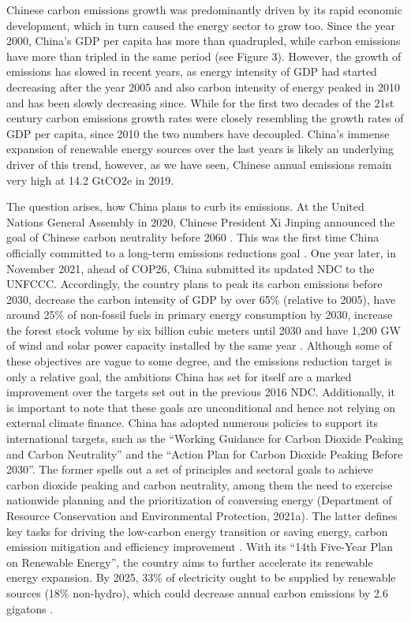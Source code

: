 \documentclass[
  12pt,
]{article}
\numberwithin{equation}{section}
\numberwithin{table}{section}
\numberwithin{figure}{section}
\begin{document}
Chinese carbon emissions growth was predominantly driven by its rapid
economic development, which in turn caused the energy sector to grow
too. Since the year 2000, China's GDP per capita has more than
quadrupled, while carbon emissions have more than tripled in the same
period (see Figure 3). However, the growth of emissions has slowed in
recent years, as energy intensity of GDP had started decreasing after
the year 2005 and also carbon intensity of energy peaked in 2010 and has
been slowly decreasing since. While for the first two decades of the
21st century carbon emissions growth rates were closely resembling the
growth rates of GDP per capita, since 2010 the two numbers have
decoupled. China's immense expansion of renewable energy sources over
the last years is likely an underlying driver of this trend, however, as
we have seen, Chinese annual emissions remain very high at 14.2 GtCO2e
in 2019.

The question arises, how China plans to curb its emissions. At the
United Nations General Assembly in 2020, Chinese President Xi Jinping
announced the goal of Chinese carbon neutrality before 2060
\citep{Jinping2020}. This was the first time China officially committed
to a long-term emissions reductions goal \citep{CAT2022}. One year
later, in November 2021, ahead of COP26, China submitted its updated NDC
to the UNFCCC. Accordingly, the country plans to peak its carbon
emissions before 2030, decrease the carbon intensity of GDP by over 65\%
(relative to 2005), have around 25\% of non-fossil fuels in primary
energy consumption by 2030, increase the forest stock volume by six
billion cubic meters until 2030 and have 1,200 GW of wind and solar
power capacity installed by the same year \citep{China2022}. Although
some of these objectives are vague to some degree, and the emissions
reduction target is only a relative goal, the ambitions China has set
for itself are a marked improvement over the targets set out in the
previous 2016 NDC. Additionally, it is important to note that these
goals are unconditional and hence not relying on external climate
finance. China has adopted numerous policies to support its
international targets, such as the ``Working Guidance for Carbon Dioxide
Peaking and Carbon Neutrality'' and the ``Action Plan for Carbon Dioxide
Peaking Before 2030''. The former spells out a set of principles and
sectoral goals to achieve carbon dioxide peaking and carbon neutrality,
among them the need to exercise nationwide planning and the
prioritization of conversing energy (Department of Resource Conservation
and Environmental Protection, 2021a). The latter defines key tasks for
driving the low-carbon energy transition or saving energy, carbon
emission mitigation and efficiency improvement \citep{DRCEP2021b}. With
its ``14th Five-Year Plan on Renewable Energy'', the country aims to
further accelerate its renewable energy expansion. By 2025, 33\% of
electricity ought to be supplied by renewable sources (18\% non-hydro),
which could decrease annual carbon emissions by 2.6 gigatons
\citep{Zhou2022}.
\end{document}
